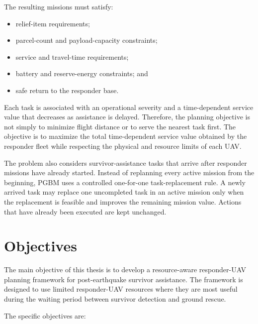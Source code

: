 The resulting missions must satisfy:

\begin{itemize}
    \item relief-item requirements;
    \item parcel-count and payload-capacity constraints;
    \item service and travel-time requirements;
    \item battery and reserve-energy constraints; and
    \item safe return to the responder base.
\end{itemize}

Each task is associated with an operational severity and a time-dependent
service value that decreases as assistance is delayed. Therefore, the planning
objective is not simply to minimize flight distance or to serve the nearest
task first. The objective is to maximize the total time-dependent service value
obtained by the responder fleet while respecting the physical and resource
limits of each UAV.

The problem also considers survivor-assistance tasks that arrive after
responder missions have already started. Instead of replanning every active
mission from the beginning, PGBM uses a controlled one-for-one task-replacement
rule. A newly arrived task may replace one uncompleted task in an active
mission only when the replacement is feasible and improves the remaining
mission value. Actions that have already been executed are kept unchanged.

\section{Objectives}

The main objective of this thesis is to develop a resource-aware responder-UAV
planning framework for post-earthquake survivor assistance. The framework is
designed to use limited responder-UAV resources where they are most useful
during the waiting period between survivor detection and ground rescue.

The specific objectives are:

